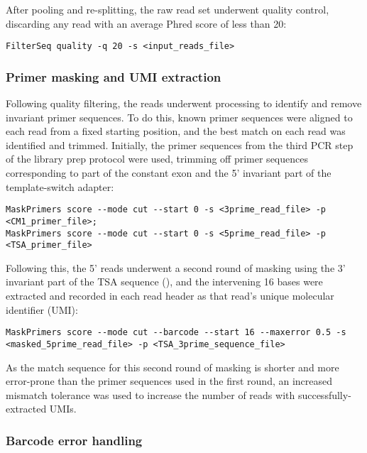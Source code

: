 After pooling and re-splitting, the raw read set underwent quality control, discarding any read with an average Phred score of less than 20:

\begin{lstlisting}
FilterSeq quality -q 20 -s <input_reads_file>
\end{lstlisting}

\subsubsection{Primer masking and UMI extraction}
\label{sec:methods_comp_igpreproc_mask}

Following quality filtering, the reads underwent processing to identify and remove invariant primer sequences. To do this, known primer sequences were aligned to each read from a fixed starting position, and the best match on each read was identified and trimmed. Initially, the primer sequences from the third PCR step of the library prep protocol were used, trimming off primer sequences corresponding to part of the constant  exon and the 5' invariant part of the template-switch adapter:

\begin{lstlisting}
MaskPrimers score --mode cut --start 0 -s <3prime_read_file> -p <CM1_primer_file>;
MaskPrimers score --mode cut --start 0 -s <5prime_read_file> -p <TSA_primer_file>
\end{lstlisting}

Following this, the 5' reads underwent a second round of masking using the 3' invariant part of the TSA sequence (), and the intervening 16 bases were extracted and recorded in each read header as that read's unique molecular identifier (UMI):

\begin{lstlisting}
MaskPrimers score --mode cut --barcode --start 16 --maxerror 0.5 -s <masked_5prime_read_file> -p <TSA_3prime_sequence_file>
\end{lstlisting}

As the match sequence for this second round of masking is shorter and more error-prone than the primer sequences used in the first round, an increased mismatch tolerance was used to increase the number of reads with successfully-extracted UMIs.

\subsubsection{Barcode error handling}
\label{sec:methods_comp_igpreproc_correct}

